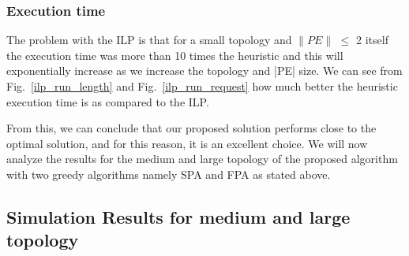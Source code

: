 \documentclass[journal]{IEEEtran}
\begin{document}
\subsubsection{Execution time}
The problem with the ILP is that for a small topology and $\lVert PE \rVert$ $\leq$ 2 itself the execution time was more than 10 times the heuristic and this will exponentially increase as we increase the topology and |PE| size. We can see from Fig.~\ref{ilp_run_length} and Fig.~\ref{ilp_run_request} how much better the heuristic execution time is as compared to the ILP.

From this, we can conclude that our proposed solution performs close to the optimal solution, and for this reason, it is an excellent choice. We will now analyze the results for the medium and large topology of the proposed algorithm with two greedy algorithms namely SPA and FPA as stated above.

\subsection{Simulation Results for medium and large topology}
\end{document}
